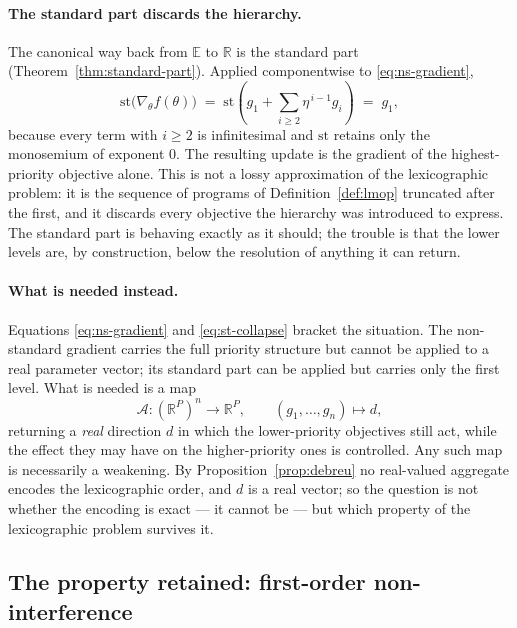 \paragraph{The standard part discards the hierarchy.}
The canonical way back from $\mathbb{E}$ to $\mathbb{R}$ is the standard part
(Theorem~\ref{thm:standard-part}). Applied componentwise to \eqref{eq:ns-gradient},
\begin{equation}
  \label{eq:st-collapse}
  \mathrm{st}\big(\nabla_\theta f(\theta)\big)
  \;=\;
  \mathrm{st}\!\left(g_1 + \sum_{i \ge 2}\eta^{\,i-1} g_i\right)
  \;=\;
  g_1 ,
\end{equation}
because every term with $i \ge 2$ is infinitesimal and $\mathrm{st}$ retains only the
monosemium of exponent $0$. The resulting update is the gradient of the
highest-priority objective alone. This is not a lossy approximation of the
lexicographic problem: it is the sequence of programs of Definition~\ref{def:lmop}
truncated after the first, and it discards every objective the hierarchy was
introduced to express. The standard part is behaving exactly as it should; the
trouble is that the lower levels are, by construction, below the resolution of
anything it can return.

\paragraph{What is needed instead.}
Equations \eqref{eq:ns-gradient} and \eqref{eq:st-collapse} bracket the situation.
The non-standard gradient carries the full priority structure but cannot be applied
to a real parameter vector; its standard part can be applied but carries only the
first level. What is needed is a map
\begin{equation}
  \label{eq:assembler}
  \mathcal{A} : (\mathbb{R}^{P})^{n} \longrightarrow \mathbb{R}^{P},
  \qquad (g_1,\dots,g_n) \longmapsto d ,
\end{equation}
returning a \emph{real} direction $d$ in which the lower-priority objectives still
act, while the effect they may have on the higher-priority ones is controlled. Any
such map is necessarily a weakening. By Proposition~\ref{prop:debreu} no real-valued
aggregate encodes the lexicographic order, and $d$ is a real vector; so the question
is not whether the encoding is exact --- it cannot be --- but which property of the
lexicographic problem survives it.

\subsection{The property retained: first-order non-interference}
\label{ssec:nsa-what-retained}

